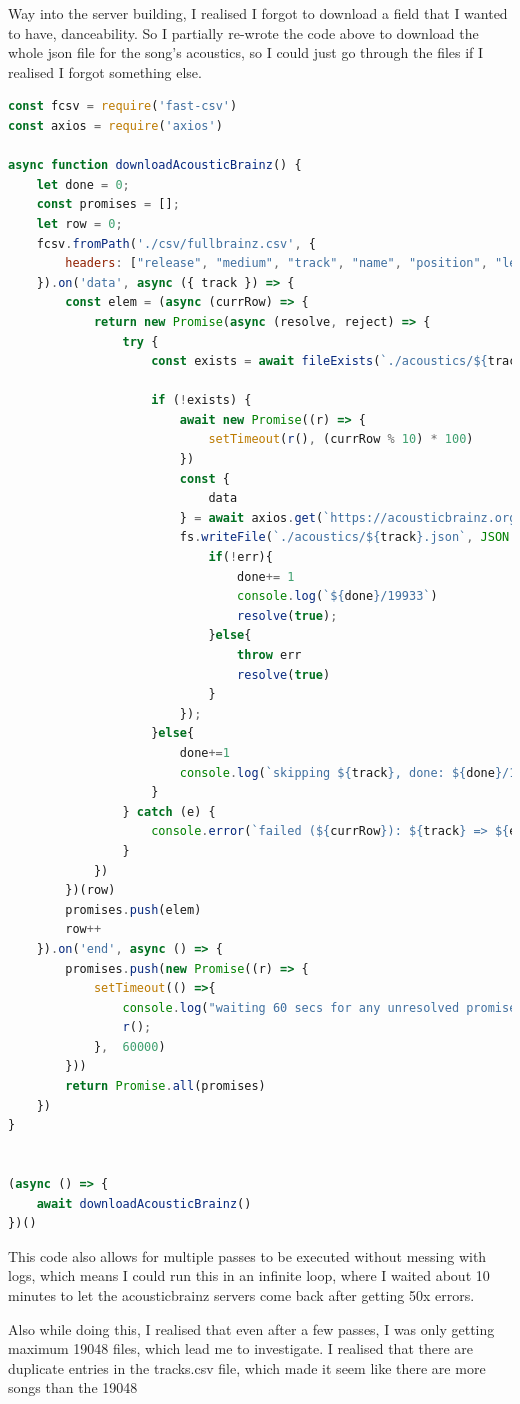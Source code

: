 \documentclass[10pt, a4paper]{article}
\begin{document}
Way into the server building, I realised I forgot to download a field that I wanted to have, danceability.
So I partially re-wrote the code above to download the whole json file for the song's acoustics, so I could just go through the files if I realised I forgot something else.

\begin{lstlisting}[language=JavaScript, label=lst:acousticbrainzDownload, caption = Downloading the whole json file for each acousticbrainz entry ]
const fcsv = require('fast-csv')
const axios = require('axios')

async function downloadAcousticBrainz() {
	let done = 0;
	const promises = [];
	let row = 0;
	fcsv.fromPath('./csv/fullbrainz.csv', {
		headers: ["release", "medium", "track", "name", "position", "length"]
	}).on('data', async ({ track }) => {
		const elem = (async (currRow) => {
			return new Promise(async (resolve, reject) => {
				try {
					const exists = await fileExists(`./acoustics/${track}.json`)

					if (!exists) {
						await new Promise((r) => {
							setTimeout(r(), (currRow % 10) * 100)
						})
						const {
							data
						} = await axios.get(`https://acousticbrainz.org/api/v1/${track}/low-level`)
						fs.writeFile(`./acoustics/${track}.json`, JSON.stringify(data),(err)=>{
							if(!err){
								done+= 1
								console.log(`${done}/19933`)
								resolve(true);
							}else{
								throw err
								resolve(true)
							}
						});
					}else{
						done+=1
						console.log(`skipping ${track}, done: ${done}/19933`)
					}
				} catch (e) {
					console.error(`failed (${currRow}): ${track} => ${e.message}`)
				}
			})
		})(row)
		promises.push(elem)
		row++
	}).on('end', async () => {
		promises.push(new Promise((r) => {
			setTimeout(() =>{
				console.log("waiting 60 secs for any unresolved promise to resolve")
				r();
			},  60000)
		}))
		return Promise.all(promises)
	})
}


(async () => {
	await downloadAcousticBrainz()
})()
\end{lstlisting}

This code also allows for multiple passes to be executed without messing with logs, which means I could run this in an infinite loop, where I waited about 10 minutes to let the acousticbrainz servers come back after getting 50x errors.

Also while doing this, I realised that even after a few passes, I was only getting maximum 19048 files, which lead me to investigate. I realised that there are duplicate entries in the tracks.csv file, which made it seem like there are more songs than the 19048
\end{document}
